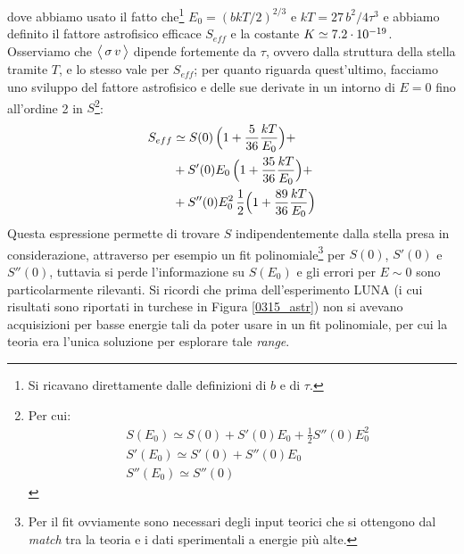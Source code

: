 dove abbiamo usato il fatto che\footnote{Si ricavano direttamente dalle definizioni di $b$ e di $\tau$.} $E_0 = (bkT/2)^{2/3}$ e $kT = 27\,b^2/4\tau^3$ e abbiamo definito il fattore astrofisico efficace $S_{eff}$ e la costante $K\simeq 7.2\cdot10^{-19}$. Osserviamo che $\bigl\langle\, \sigma\,v\, \bigr\rangle$ dipende fortemente da $\tau$, ovvero dalla struttura della stella tramite $T$, e lo stesso vale per $S_{eff}$; per quanto riguarda quest'ultimo, facciamo uno sviluppo del fattore astrofisico e delle sue derivate in un intorno di $E=0$ fino all'ordine 2 in $S$\footnote{Per cui:%
\begin{displaymath}%
\begin{aligned}%
&S(E_0)   \simeq S(0) + S'(0) E_0 + \frac{1}{2} S''(0) E_0^2 \\ 
&S'(E_0)  \simeq  S'(0)  + S''(0) E_0 \\ 
&S''(E_0) \simeq  S''(0)
\end{aligned}%
\end{displaymath}%
}:
\begin{displaymath}
\begin{aligned}
S_{eff} &\simeq S(0)\, \Bigl ( 1+\frac{5}{36}\frac{kT}{E_0} \Bigr ) +\\
&+ S'(0) E_0\, \Bigl ( 1+\frac{35}{36}\frac{kT}{E_0} \Bigr ) +\\
&+ S''(0) E_0^2\, \frac{1}{2} \Bigl ( 1+\frac{89}{36}\frac{kT}{E_0} \Bigr )
\end{aligned}
\end{displaymath}
Questa espressione permette di trovare $S$ indipendentemente dalla stella presa in considerazione, attraverso per esempio un fit polinomiale\footnote{Per  il fit ovviamente sono necessari degli input teorici che si ottengono dal \textit{match} tra la teoria e i dati sperimentali a energie più alte.} per $S(0)$, $S'(0)$ e $S''(0)$, tuttavia si perde l'informazione su $S(E_0)$ e gli errori per $E\sim0$ sono particolarmente rilevanti. 
Si ricordi che prima dell'esperimento LUNA (i cui risultati sono riportati in turchese in Figura \ref{0315_astr}) non si avevano acquisizioni per basse energie tali da poter usare in un fit polinomiale, per cui la teoria era l'unica soluzione per esplorare tale \textit{range}.






